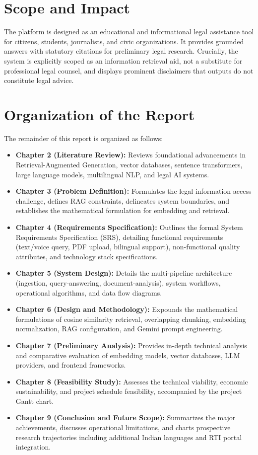 \documentclass[12pt,a4paper]{report}
\begin{document}
\section{Scope and Impact}
The platform is designed as an educational and informational legal assistance tool for citizens, students, journalists, and civic organizations. It provides grounded answers with statutory citations for preliminary legal research. Crucially, the system is explicitly scoped as an information retrieval aid, not a substitute for professional legal counsel, and displays prominent disclaimers that outputs do not constitute legal advice.

\section{Organization of the Report}
The remainder of this report is organized as follows:
\begin{itemize}
    \item \textbf{Chapter 2 (Literature Review):} Reviews foundational advancements in Retrieval-Augmented Generation, vector databases, sentence transformers, large language models, multilingual NLP, and legal AI systems.
    \item \textbf{Chapter 3 (Problem Definition):} Formulates the legal information access challenge, defines RAG constraints, delineates system boundaries, and establishes the mathematical formulation for embedding and retrieval.
    \item \textbf{Chapter 4 (Requirements Specification):} Outlines the formal System Requirements Specification (SRS), detailing functional requirements (text/voice query, PDF upload, bilingual support), non-functional quality attributes, and technology stack specifications.
    \item \textbf{Chapter 5 (System Design):} Details the multi-pipeline architecture (ingestion, query-answering, document-analysis), system workflows, operational algorithms, and data flow diagrams.
    \item \textbf{Chapter 6 (Design and Methodology):} Expounds the mathematical formulations of cosine similarity retrieval, overlapping chunking, embedding normalization, RAG configuration, and Gemini prompt engineering.
    \item \textbf{Chapter 7 (Preliminary Analysis):} Provides in-depth technical analysis and comparative evaluation of embedding models, vector databases, LLM providers, and frontend frameworks.
    \item \textbf{Chapter 8 (Feasibility Study):} Assesses the technical viability, economic sustainability, and project schedule feasibility, accompanied by the project Gantt chart.
    \item \textbf{Chapter 9 (Conclusion and Future Scope):} Summarizes the major achievements, discusses operational limitations, and charts prospective research trajectories including additional Indian languages and RTI portal integration.
\end{itemize}
\end{document}
